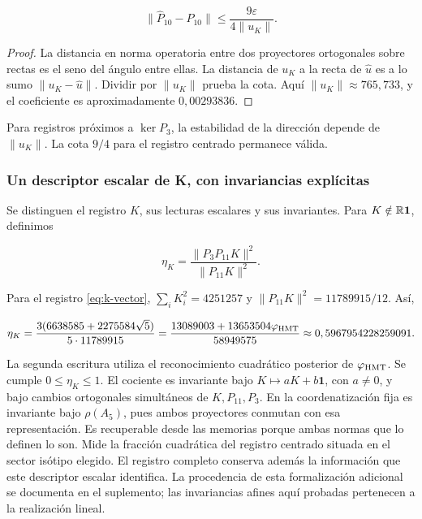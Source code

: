 \begin{equation}
\boxed{
\|\widehat P_{10}-P_{10}\|
\le\frac{9\varepsilon}{4\|u_K\|}.
}
\label{nuc11:eq:15}
\end{equation}



\begin{proof}
La distancia en norma operatoria entre dos proyectores ortogonales
sobre rectas es el seno del ángulo entre ellas.
La distancia de \(u_K\) a la recta de \(\widehat u\) es a lo sumo
\(\|u_K-\widehat u\|\). Dividir por \(\|u_K\|\) prueba la cota.
Aquí \(\|u_K\|\approx765{,}733\), y el coeficiente es
aproximadamente \(0{,}00293836\).
\end{proof}
Para registros próximos a \(\ker P_3\), la estabilidad de la
dirección depende de \(\|u_K\|\).
La cota \(9/4\) para el registro centrado permanece válida.

\subsubsection{Un descriptor escalar de K, con invariancias explícitas}

Se distinguen el registro \(K\), sus lecturas escalares y sus
invariantes. Para \(K\notin\mathbb R\mathbf1\), definimos



\begin{equation}
\eta_K=\frac{\|P_3P_{11}K\|^2}{\|P_{11}K\|^2}.
\label{nuc11:eq:16}
\end{equation}



Para el registro \eqref{eq:k-vector},
\(\sum_iK_i^2=4251257\) y
\(\|P_{11}K\|^2=11789915/12\). Así,



\begin{equation}
\eta_K=
\frac{3(6638585+2275584\sqrt5)}{5\cdot11789915}
=\frac{13089003+13653504\varphi_{\rm HMT}}{58949575}
\approx0,5967954228259091.
\label{nuc11:eq:17}
\end{equation}



La segunda escritura utiliza el reconocimiento cuadrático posterior
de \(\varphi_{\rm HMT}\).
Se cumple \(0\le\eta_K\le1\).
El cociente es invariante bajo
\(K\mapsto aK+b\mathbf1\), con \(a\ne0\), y bajo cambios
ortogonales simultáneos de \(K,P_{11},P_3\).
En la coordenatización fija es invariante bajo \(\rho(A_5)\), pues ambos
proyectores conmutan con esa representación.
Es recuperable desde las memorias porque ambas normas que lo
definen lo son.
Mide la fracción cuadrática del registro centrado situada en el
sector isótipo elegido.
El registro completo conserva además la información que este
descriptor escalar identifica.
La procedencia de esta formalización adicional se documenta en
el suplemento; las invariancias afines aquí probadas pertenecen
a la realización lineal.


